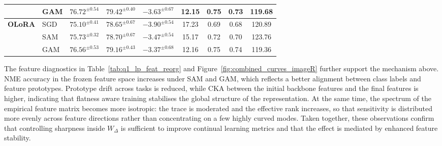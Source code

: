\documentclass[10pt]{article} %
\begin{document}
\begin{table}[htpb]
{\begin{tabular}{l l ccc  cc cc}
 \rowcolor{LightPurple}&GAM  &$76.72^{\pm0.54}$ & $79.42^{\pm0.40}$ & $-3.63^{\pm0.67}$  & 12.15 & 0.75 & 0.73 & 119.68 \\
\midrule
\multirow{2}{*}{\textbf{OLoRA}}
 & SGD     &$75.10^{\pm0.41}$ & $78.65^{\pm0.67}$ & $-3.90^{\pm0.54}$ & 17.23 & 0.69 & 0.68 & 120.89 \\
 & SAM     &$75.73^{\pm0.32}$ & $78.70^{\pm0.67}$ & $-3.47^{\pm0.54}$ & 15.17 & 0.72 & 0.70 & 123.76 \\
\rowcolor{LightPurple} &GAM  &$76.56^{\pm0.53}$ & $79.16^{\pm0.43}$ & $-3.37^{\pm0.68}$  & 12.16 & 0.75 & 0.74 & 119.36\\
\bottomrule
\end{tabular}
}
\end{table}




The feature diagnostics in Table~\ref{tab:q1_lp_feat_reorg} and Figure~\ref{fig:combined_curves_imageR} further support the mechanism above. NME accuracy in the frozen feature space increases under SAM and GAM, which reflects a better alignment between class labels and feature prototypes. Prototype drift across tasks is reduced, while CKA between the initial backbone features and the final features is higher, indicating that flatness aware training stabilises the global structure of the representation. At the same time, the spectrum of the empirical feature matrix becomes more isotropic: the trace is moderated and the effective rank increases, so that sensitivity is distributed more evenly across feature directions rather than concentrating on a few highly curved modes. Taken together, these observations confirm that controlling sharpness inside $W_\Delta$ is sufficient to improve continual learning metrics and that the effect is mediated by enhanced feature stability.




\end{document}
